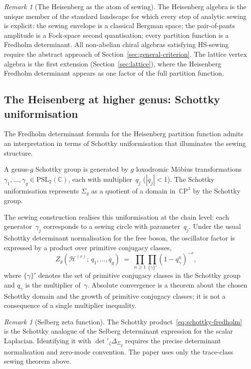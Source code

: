 \documentclass[11pt,reqno]{amsart}
\theoremstyle{definition}
\theoremstyle{remark}
\newtheorem{remark}[theorem]{Remark}
\newcommand{\cH}{\mathcal{H}}
\newcommand{\bC}{\mathbb{C}}
\numberwithin{equation}{section}
\begin{document}
\begin{remark}[The Heisenberg as the atom of sewing]
\label{rem:heisenberg-atom}
The Heisenberg algebra is the unique member of the standard
landscape for which every step of analytic sewing is
explicit: the sewing envelope is a classical Bergman space;
the pair-of-pants amplitude is a Fock-space second
quantisation; every partition function is a Fredholm
determinant.  All non-abelian chiral algebras satisfying
HS-sewing require the abstract approach of
Section~\ref{sec:general-criterion}.  The lattice vertex
algebra is the first extension (Section~\ref{sec:lattice}),
where the Heisenberg Fredholm determinant appears as one
factor of the full partition function.
\end{remark}


\subsection{The Heisenberg at higher genus: Schottky
 uniformisation}\label{subsec:schottky}

The Fredholm determinant formula for the Heisenberg partition
function admits an interpretation in terms of Schottky
uniformisation that illuminates the sewing structure.

A genus-$g$ Schottky group is generated by $g$
loxodromic M\"obius transformations
$\gamma_1,\ldots,\gamma_g \in \mathrm{PSL}_2(\bC)$, each
with multiplier~$q_j$ ($|q_j| < 1$).  The Schottky
uniformisation represents $\Sigma_g$ as a quotient of a
domain in~$\bC\mathrm{P}^1$ by the Schottky group.

The sewing construction realises this uniformisation at the
chain level: each generator~$\gamma_j$ corresponds to a sewing
circle with parameter~$q_j$. Under the usual Schottky determinant
normalisation for the free boson, the oscillator factor is expressed
by a product over primitive conjugacy classes,
\begin{equation}\label{eq:schottky-fredholm}
Z_g(\cH^{(r)};\,q_1,\ldots,q_g)
\;=\;
\prod_{n \geq 1}
\prod_{\{\gamma\}'} (1 - q_\gamma^n)^{-r},
\end{equation}
where $\{\gamma\}'$ denotes the set of primitive conjugacy
classes in the Schottky group and $q_\gamma$ is the multiplier
of~$\gamma$. Absolute convergence is a theorem about the chosen
Schottky domain and the growth of primitive conjugacy classes; it is
not a consequence of a single multiplier inequality.

\begin{remark}[Selberg zeta function]
\label{rem:selberg-zeta}
The Schottky product~\eqref{eq:schottky-fredholm} is the
Schottky analogue of the Selberg determinant expression for the
scalar Laplacian. Identifying it with
$\det{}'_\zeta\Delta_{\Sigma_g}$ requires the precise determinant
normalisation and zero-mode convention. The paper uses only the
trace-class sewing theorem above.
\end{remark}
\end{document}
